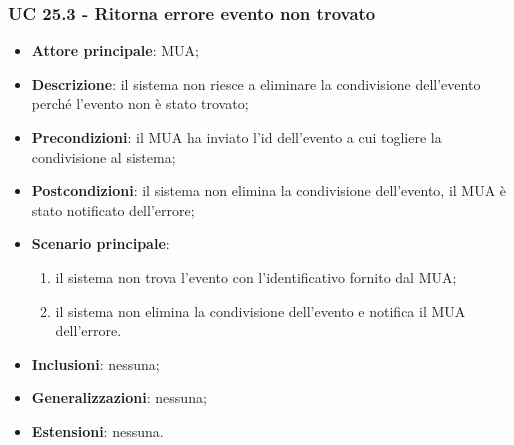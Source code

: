 \subsubsection{UC 25.3 - Ritorna errore evento non trovato} \label{sec:UC25.3}
    \begin{itemize}
        \item \textbf{Attore principale}: MUA;
        \item \textbf{Descrizione}: il sistema non riesce a eliminare la condivisione dell'evento perché l'evento non è stato trovato;
        \item \textbf{Precondizioni}: il MUA ha inviato l'id dell'evento a cui togliere la condivisione al sistema;
        \item \textbf{Postcondizioni}: il sistema non elimina la condivisione dell'evento, il MUA è stato notificato dell'errore;
        \item \textbf{Scenario principale}:
            \begin{enumerate}
                \item il sistema non trova l'evento con l'identificativo fornito dal MUA;
                \item il sistema non elimina la condivisione dell'evento e notifica il MUA dell'errore.
            \end{enumerate}
        \item \textbf{Inclusioni}: nessuna;
        \item \textbf{Generalizzazioni}: nessuna;
        \item \textbf{Estensioni}: nessuna.
    \end{itemize}

